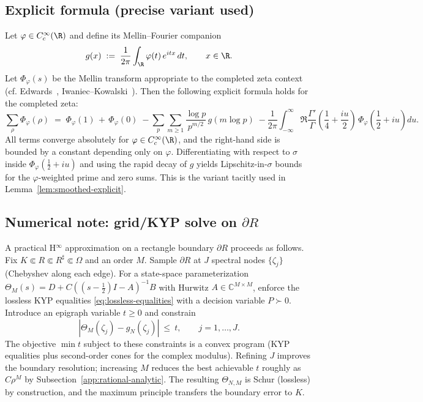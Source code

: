 \documentclass[11pt]{article}
\theoremstyle{remark}
\newcommand{\C}{\mathbb{C}}
\begin{document}
\subsection{Explicit formula (precise variant used)}\label{app:explicit-formula}
Let \(\varphi\in C_c^{\infty}(\R)\) and define its Mellin--Fourier companion
\[
 g(x)\;:=\;\frac{1}{2\pi}\int_{\R} \varphi(t)\,e^{itx}\,dt,\qquad x\in\R.
\]
Let \(\Phi_{\varphi}(s)\) be the Mellin transform appropriate to the completed zeta context (cf. Edwards~\cite[Ch.~1, §5]{Edwards}, Iwaniec--Kowalski~\cite[Ch.~5]{IwaniecKowalski}). Then the following explicit formula holds for the completed zeta:
\[
 \sum_{\rho} \Phi_{\varphi}(\rho)\;=\;\Phi_{\varphi}(1)\,+\,\Phi_{\varphi}(0)\;-
 \sum_{p}\sum_{m\ge 1} \frac{\log p}{p^{m/2}}\,g(m\log p)\;-
 \frac{1}{2\pi}\int_{-\infty}^{\infty} \Re\frac{\Gamma'}{\Gamma}\!\left(\frac{1}{4}+\frac{iu}{2}\right)\,\Phi_{\varphi}\!\left(\frac12+iu\right)du.
\]
All terms converge absolutely for \(\varphi\in C_c^{\infty}(\R)\), and the right-hand side is bounded by a constant depending only on \(\varphi\). Differentiating with respect to \(\sigma\) inside \(\Phi_{\varphi}(\tfrac12+iu)\) and using the rapid decay of \(g\) yields Lipschitz-in-\(\sigma\) bounds for the \(\varphi\)-weighted prime and zero sums. This is the variant tacitly used in Lemma~\ref{lem:smoothed-explicit}.
\subsection{Numerical note: grid/KYP solve on \(\partial R\)}\label{app:numerics}
A practical H$^\infty$ approximation on a rectangle boundary \(\partial R\) proceeds as follows. Fix \(K\Subset R\Subset R^\sharp\Subset\Omega\) and an order \(M\). Sample \(\partial R\) at \(J\) spectral nodes \(\{\zeta_j\}\) (Chebyshev along each edge). For a state-space parameterization \(\Theta_M(s)=D+C((s-\tfrac12)I-A)^{-1}B\) with Hurwitz \(A\in\C^{M\times M}\), enforce the lossless KYP equalities \eqref{eq:lossless-equalities} with a decision variable \(P\succ 0\). Introduce an epigraph variable \(t\ge 0\) and constrain
\[
 |\Theta_M(\zeta_j)-g_N(\zeta_j)|\ \le\ t,\qquad j=1,\dots,J.
\]
The objective \(\min t\) subject to these constraints is a convex program (KYP equalities plus second-order cones for the complex modulus). Refining \(J\) improves the boundary resolution; increasing \(M\) reduces the best achievable \(t\) roughly as \(C\rho^M\) by Subsection~\ref{app:rational-analytic}. The resulting \(\Theta_{N,M}\) is Schur (lossless) by construction, and the maximum principle transfers the boundary error to \(K\).
\end{document}
